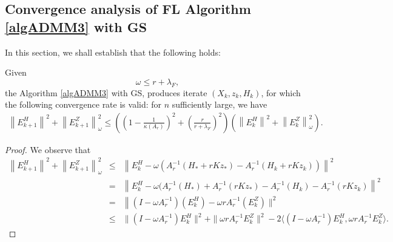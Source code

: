 \begin{itemize}
\subsection{Convergence analysis of FL Algorithm \ref{algADMM3} with GS} 
In this section, we shall establish that the following holds: 
\begin{theorem}\label{main:theorem10} 
Given 
\begin{equation}
\omega \leq r + \lambda_F, 
\end{equation}
the Algorithm \ref{algADMM3} with GS, produces iterate $(X_k, z_k, H_k)$, for which the following convergence rate is valid: for $n$ sufficiently large, we have 
\begin{eqnarray*}
\left \|E_{k+1}^H \right \|^2 + \left \|E_{k+1}^Z \right \|_\omega^2 \leq \left ( \left ( 1 - \frac{1}{\kappa(A_r)} \right )^2 + \left ( \frac{r}{r+\lambda_F} \right )^2 \right ) \left (\left \|E_{k}^H \right \|^2 + \left \|E_{k}^Z \right \|_\omega^2 \right ). 
\end{eqnarray*}
\end{theorem}
\begin{proof} 
We observe that  
\begin{eqnarray*}
\left \|E_{k+1}^H \right \|^2 + \left \|E_{k+1}^Z \right \|_\omega^2  &\leq& \left \|E_k^H - \omega (A_r^{-1}(H_*+rKz_*) - A_{r}^{-1} (H_k + rKz_k)) \right \|^2 \\
&=&  \left \|E_k^H - \omega (A_{r}^{-1}(H_*) + A_r^{-1}(rKz_*) - A_r^{-1}(H_k) - A_r^{-1}(rKz_k) \right \|^2 \\
&=& \left \|(I - \omega A_{r}^{-1})(E_k^H) - \omega r A_r^{-1} (E_k^Z) \right. \|^2 \\
&\leq& \|(I - \omega A_r^{-1}) E_k^H \|^2 + \|\omega r A_r^{-1} E_k^Z\|^2 - 2 \langle(I - \omega A_r^{-1}) E_k^H, \omega r A_r^{-1} E_k^Z \rangle. 
\end{eqnarray*}

\end{proof}
\end{itemize}
